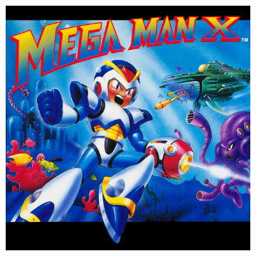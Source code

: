 \begin{figure}[htp]
	\centering
	\begin{subfigure}[c]{0.4\linewidth}
		\centering
		\includegraphics[width=\linewidth]{figures/X1/mmx_cover.jpeg}
	\end{subfigure}
	\begin{subfigure}[c]{0.4\linewidth}
		\centering

\end{subfigure}
\end{figure}
